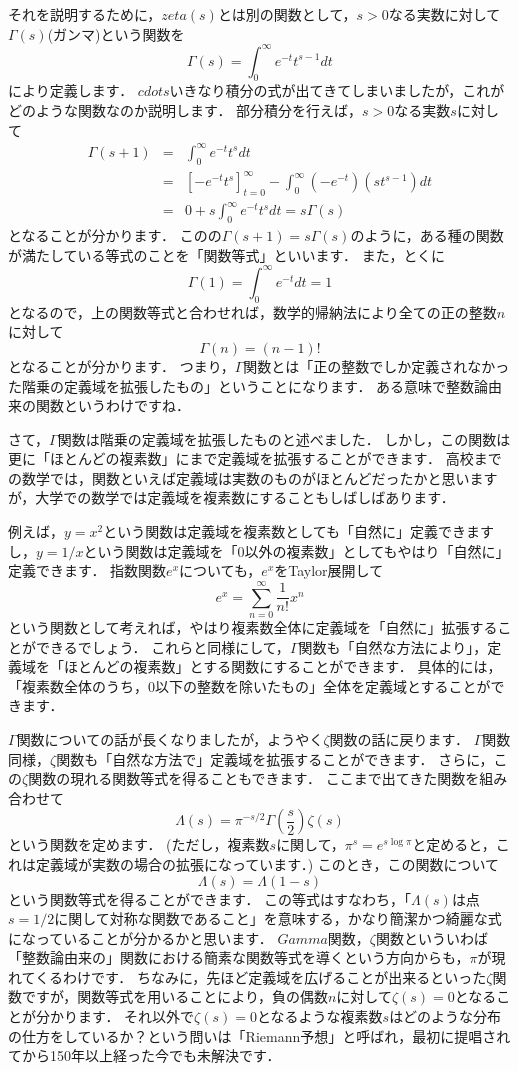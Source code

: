 それを説明するために，$zeta(s)$とは別の関数として，$s>0$なる実数に対して$\Gamma (s)$(ガンマ)という関数を
\[
	\Gamma (s) = \int_{0}^{\infty} e^{-t}t^{s-1}dt
\]
により定義します．
$cdots$いきなり積分の式が出てきてしまいましたが，これがどのような関数なのか説明します．
部分積分を行えば，$s>0$なる実数$s$に対して
\begin{eqnarray*}
	\Gamma(s+1) &=& \int_{0}^{\infty} e^{-t}t^{s}dt \\
	&=& \left[ -e^{-t}t^{s} \right]_{t=0}^{\infty} - \int_{0}^{\infty} (-e^{-t})(st^{s-1})dt \\
	&=& 0+s\int_{0}^{\infty} e^{-t}t^{s}dt =s\Gamma(s)
\end{eqnarray*}
となることが分かります．
このの$\Gamma(s+1)=s\Gamma(s)$のように，ある種の関数が満たしている等式のことを「関数等式」といいます．
また，とくに
\[
\Gamma(1)=\int_{0}^{\infty} e^{-t}dt=1
\]
となるので，上の関数等式と合わせれば，数学的帰納法により全ての正の整数$n$に対して
\[
	\Gamma(n)=(n-1)!
\]
となることが分かります．
つまり，$\Gamma$関数とは「正の整数でしか定義されなかった階乗の定義域を拡張したもの」ということになります．
ある意味で整数論由来の関数というわけですね．

さて，$\Gamma$関数は階乗の定義域を拡張したものと述べました．
しかし，この関数は更に「ほとんどの複素数」にまで定義域を拡張することができます．
高校までの数学では，関数といえば定義域は実数のものがほとんどだったかと思いますが，大学での数学では定義域を複素数にすることもしばしばあります．

例えば，$y=x^2$という関数は定義域を複素数としても「自然に」定義できますし，$y=1/x$という関数は定義域を「$0$以外の複素数」としてもやはり「自然に」定義できます．
指数関数$e^x$についても，$e^x$をTaylor展開して
\[
	e^x = \sum_{n=0}^{\infty} \frac{1}{n!}x^{n}
\]
という関数として考えれば，やはり複素数全体に定義域を「自然に」拡張することができるでしょう．
これらと同様にして，$\Gamma$関数も「自然な方法により」，定義域を「ほとんどの複素数」とする関数にすることができます．
具体的には，「複素数全体のうち，$0$以下の整数を除いたもの」全体を定義域とすることができます．

$\Gamma$関数についての話が長くなりましたが，ようやく$\zeta$関数の話に戻ります．
$\Gamma$関数同様，$\zeta$関数も「自然な方法で」定義域を拡張することができます．
さらに，この$\zeta$関数の現れる関数等式を得ることもできます．
ここまで出てきた関数を組み合わせて
\[
\Lambda (s)=\pi ^{-s/2} \Gamma(\frac{s}{2}) \zeta (s)
\]
という関数を定めます．
(ただし，複素数$s$に関して，$\pi ^s = e^{s \log{\pi}}$と定めると，これは定義域が実数の場合の拡張になっています．)
このとき，この関数について
\[
\Lambda (s)=\Lambda(1-s)
\]
という関数等式を得ることができます．
この等式はすなわち，「$\Lambda (s)$は点$s=1/2$に関して対称な関数であること」を意味する，かなり簡潔かつ綺麗な式になっていることが分かるかと思います．
$Gamma$関数，$\zeta$関数といういわば「整数論由来の」関数における簡素な関数等式を導くという方向からも，$\pi$が現れてくるわけです．
ちなみに，先ほど定義域を広げることが出来るといった$\zeta$関数ですが，関数等式を用いることにより，負の偶数$n$に対して$\zeta (s)=0$となることが分かります．
それ以外で$\zeta (s)=0$となるような複素数$s$はどのような分布の仕方をしているか？という問いは「Riemann予想」と呼ばれ，最初に提唱されてから150年以上経った今でも未解決です．

